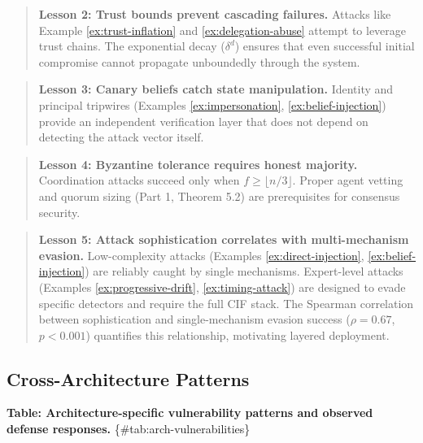 \documentclass[
]{article}
\begin{document}
\begin{quote}
\textbf{Lesson 2: Trust bounds prevent cascading failures.} Attacks like
Example \ref{ex:trust-inflation} and \ref{ex:delegation-abuse} attempt
to leverage trust chains. The exponential decay (\(\delta^d\)) ensures
that even successful initial compromise cannot propagate unboundedly
through the system.
\end{quote}

\begin{quote}
\textbf{Lesson 3: Canary beliefs catch state manipulation.} Identity and
principal tripwires (Examples \ref{ex:impersonation},
\ref{ex:belief-injection}) provide an independent verification layer
that does not depend on detecting the attack vector itself.
\end{quote}

\begin{quote}
\textbf{Lesson 4: Byzantine tolerance requires honest majority.}
Coordination attacks succeed only when \(f \geq \lfloor n/3 \rfloor\).
Proper agent vetting and quorum sizing (Part 1, Theorem 5.2) are
prerequisites for consensus security.
\end{quote}

\begin{quote}
\textbf{Lesson 5: Attack sophistication correlates with multi-mechanism
evasion.} Low-complexity attacks (Examples \ref{ex:direct-injection},
\ref{ex:belief-injection}) are reliably caught by single mechanisms.
Expert-level attacks (Examples \ref{ex:progressive-drift},
\ref{ex:timing-attack}) are designed to evade specific detectors and
require the full CIF stack. The Spearman correlation between
sophistication and single-mechanism evasion success (\(\rho = 0.67\),
\(p < 0.001\)) quantifies this relationship, motivating layered
deployment.
\end{quote}

\subsection{Cross-Architecture Patterns}\label{sec:cross-arch-patterns}

\textbf{Table: Architecture-specific vulnerability patterns and observed
defense responses.} \{\#tab:arch-vulnerabilities\}
\end{document}
